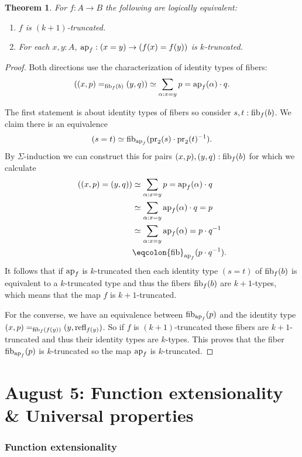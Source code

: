 \documentclass{amsart}
\theoremstyle{theorem}
\newtheorem*{thm}{Theorem}
\theoremstyle{definition}
\theoremstyle{remark}
\newcommand{\0}{\mathbbe{0}}
\newcommand{\1}{\mathbbe{1}}
\newcommand{\2}{\mathbbe{2}}
\newcommand{\3}{\mathbbe{3}}
\newcommand{\4}{\mathbbe{4}}
\newcommand{\term}[1]{{\textup{#1}}}
\newcommand{\type}[1]{{\textup{#1}}}
\newcommand{\pr}{\term{pr}}
\newcommand{\refl}{\term{refl}}
\newcommand{\ap}{\term{ap}}
\newcommand{\fib}{\type{fib}}
\begin{document}
\begin{thm} For $f \colon A \to B$ the following are logically equivalent:
\begin{enumerate}
\item $f$ is $(k+1)$-truncated.
\item For each $x,y:A$, $\ap_f :(x=y) \to (f(x)=f(y))$ is $k$-truncated.
\end{enumerate}
\end{thm}
\begin{proof}
Both directions use the characterization of identity types of fibers:
\[ ((x,p) =_{\fib_f(b)}(y,q) ) \simeq \sum_{\alpha: x=y} p = \ap_f(\alpha) \cdot q.\]

The first statement is about identity types of fibers so consider $s,t : \fib_f(b)$.  We claim there is an equivalence \[ (s=t) \simeq \fib_{\ap_f}(\pr_2(s)\cdot \pr_2(t)^{-1}).\] By $\Sigma$-induction we can construct this for pairs $(x,p), (y,q) : \fib_f(b)$ for which we calculate
\begin{align*} ((x,p)=(y,q)) &\simeq \sum_{\alpha : x= y} p = \ap_f(\alpha)\cdot q  \\ &\simeq \sum_{\alpha:x=y} \ap_f(\alpha)\cdot q = p \\ &\simeq \sum_{\alpha :x=y} \ap_f(\alpha) = p \cdot q^{-1} \\
&\eqcolon \fib_{\ap_f}(p\cdot q{^{-1}}).
\end{align*}
It follows that if $\ap_f$ is $k$-truncated then each identity type $(s=t)$ of $\fib_f(b)$ is equivalent to a $k$-truncated type and thus the fibers $\fib_f(b)$ are $k+1$-types, which means that the map $f$ is $k+1$-truncated.

For the converse, we have an equivalence between $\fib_{\ap_f}(p)$ and the identity type $(x,p) =_{\fib_f(f(y))}(y,\refl_{f(y)})$. So if $f$ is $(k+1)$-truncated these fibers are $k+1$-truncated and thus  their identity types are $k$-types. This proves that the fiber $\fib_{\ap_f}(p)$ is $k$-truncated so the map $\ap_f$ is $k$-truncated.
\end{proof}


\part*{August 5: Function extensionality \& Universal properties}


\section*{Function extensionality}
\end{document}
